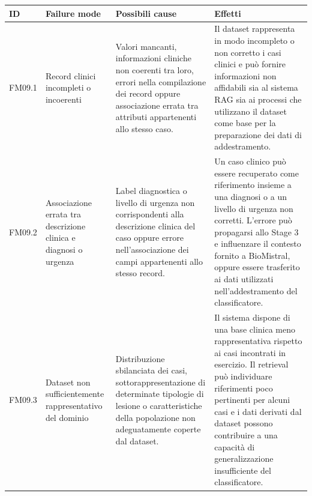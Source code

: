 \begin{table}[H]
    \centering
    \footnotesize
    \setlength{\tabcolsep}{3pt}
    \renewcommand{\arraystretch}{1.1}

    \begin{tabularx}{\textwidth}{
        >{\raggedright\arraybackslash}p{1.1cm}
        >{\raggedright\arraybackslash}p{3cm}
        >{\raggedright\arraybackslash}p{5cm}
        X
    }
        \toprule

        \textbf{ID} &
        \textbf{Failure mode} &
        \textbf{Possibili cause} &
        \textbf{Effetti} \\

        \midrule

        FM09.1 &
        Record clinici incompleti o incoerenti &
        Valori mancanti, informazioni cliniche non coerenti tra loro,
        errori nella compilazione dei record oppure associazione errata
        tra attributi appartenenti allo stesso caso. &
        Il dataset rappresenta in modo incompleto o non corretto i casi
        clinici e può fornire informazioni non affidabili sia al sistema
        RAG sia ai processi che utilizzano il dataset come base per la
        preparazione dei dati di addestramento. \\

        \midrule

        FM09.2 &
        Associazione errata tra descrizione clinica e diagnosi o urgenza &
        Label diagnostica o livello di urgenza non corrispondenti alla
        descrizione clinica del caso oppure errore nell'associazione dei
        campi appartenenti allo stesso record. &
        Un caso clinico può essere recuperato come riferimento insieme
        a una diagnosi o a un livello di urgenza non corretti. L'errore
        può propagarsi allo Stage 3 e influenzare il contesto fornito
        a BioMistral, oppure essere trasferito ai dati utilizzati
        nell'addestramento del classificatore. \\

        \midrule

        FM09.3 &
        Dataset non sufficientemente rappresentativo del dominio &
        Distribuzione sbilanciata dei casi, sottorappresentazione di
        determinate tipologie di lesione o caratteristiche della
        popolazione non adeguatamente coperte dal dataset. &
        Il sistema dispone di una base clinica meno rappresentativa
        rispetto ai casi incontrati in esercizio. Il retrieval può
        individuare riferimenti poco pertinenti per alcuni casi e i dati
        derivati dal dataset possono contribuire a una capacità di
        generalizzazione insufficiente del classificatore. \\


\end{tabularx}
\end{table}

